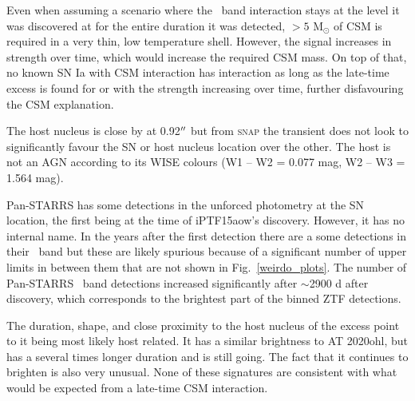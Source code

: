 \documentclass[a4paper,oneside,12pt, class=Latex/Classes/PhDthesisPSnPDF, crop=false]{standalone}
\begin{document}
Even when assuming a scenario where the \ztfr\ band interaction stays at the level it was discovered at for the entire duration it was detected, $> 5$ M$_\odot$ of CSM is required in a very thin, low temperature shell. However, the signal increases in strength over time, which would increase the required CSM mass. On top of that, no known SN Ia with CSM interaction has interaction as long as the late-time excess is found for or with the strength increasing over time, further disfavouring the CSM explanation.

The host nucleus is close by at 0.92$^{\prime\prime}$ but from \textsc{snap} the transient does not look to significantly favour the SN or host nucleus location over the other. The host is not an AGN according to its WISE colours (W1 -- W2 = 0.077 mag, W2 -- W3 = 1.564 mag). 

Pan-STARRS has some detections in the unforced photometry at the SN location, the first being at the time of iPTF15aow's discovery. However, it has no internal name. In the years after the first detection there are a some detections in their \ztfi\ band but these are likely spurious because of a significant number of upper limits in between them that are not shown in Fig.~\ref{weirdo_plots}. The number of Pan-STARRS \ztfi\ band detections increased significantly after $\sim$2900 d after discovery, which corresponds to the brightest part of the binned ZTF detections.

The duration, shape, and close proximity to the host nucleus of the excess point to it being most likely host related. It has a similar brightness to AT 2020ohl, but has a several times longer duration and is still going. The fact that it continues to brighten is also very unusual. None of these signatures are consistent with what would be expected from a late-time CSM interaction.
\end{document}
